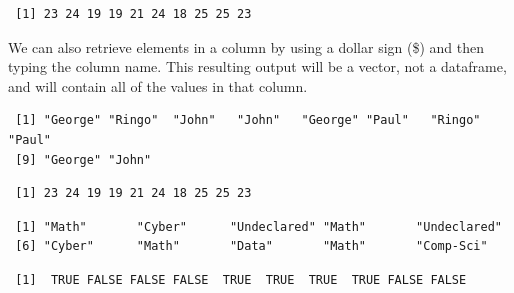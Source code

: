 \documentclass[
  letterpaper,
  DIV=11,
  numbers=noendperiod]{scrreprt}
\newenvironment{Shaded}{\begin{snugshade}}{\end{snugshade}}
\newcommand{\NormalTok}[1]{\textcolor[rgb]{0.00,0.23,0.31}{#1}}
\newcommand{\SpecialCharTok}[1]{\textcolor[rgb]{0.37,0.37,0.37}{#1}}
\begin{document}
\begin{verbatim}
 [1] 23 24 19 19 21 24 18 25 25 23
\end{verbatim}

We can also retrieve elements in a column by using a dollar sign (\$)
and then typing the column name. This resulting output will be a vector,
not a dataframe, and will contain all of the values in that column.

\begin{Shaded}
\end{Shaded}

\begin{verbatim}
 [1] "George" "Ringo"  "John"   "John"   "George" "Paul"   "Ringo"  "Paul"  
 [9] "George" "John"  
\end{verbatim}

\begin{Shaded}
\end{Shaded}

\begin{verbatim}
 [1] 23 24 19 19 21 24 18 25 25 23
\end{verbatim}

\begin{Shaded}
\end{Shaded}

\begin{verbatim}
 [1] "Math"       "Cyber"      "Undeclared" "Math"       "Undeclared"
 [6] "Cyber"      "Math"       "Data"       "Math"       "Comp-Sci"  
\end{verbatim}

\begin{Shaded}
\end{Shaded}

\begin{verbatim}
 [1]  TRUE FALSE FALSE FALSE  TRUE  TRUE  TRUE  TRUE FALSE FALSE
\end{verbatim}
\end{document}
